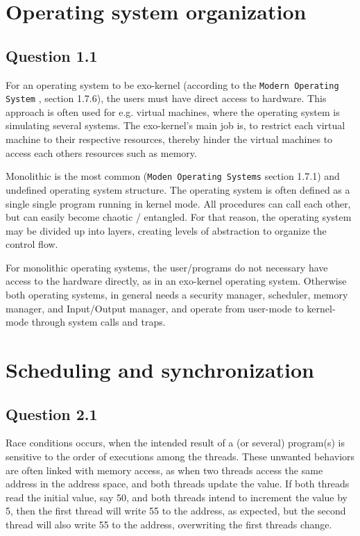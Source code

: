 
\section{Operating system organization}
\subsection*{Question 1.1}

For an operating system to be exo-kernel (according to the \texttt{Modern Operating System} \cite{tanembaum}, section 1.7.6), the users must have direct access to hardware. This approach is often used for e.g. virtual machines, where the operating system is simulating several systems. The exo-kernel's main job is, to restrict each virtual machine to their respective resources, thereby hinder the virtual machines to access each others resources such as memory. 

Monolithic is the most common (\texttt{Moden Operating Systems} section 1.7.1) and undefined operating system structure. The operating system is often defined as a single single program running in kernel mode. All procedures can call each other, but can easily become chaotic / entangled. For that reason, the operating system may be divided up into layers, creating levels of abstraction to organize the control flow.

For monolithic operating systems, the user/programs do not necessary have access to the hardware directly, as in an exo-kernel operating system. Otherwise both operating systems, in general needs a security manager, scheduler, memory manager, and Input/Output manager, and operate from user-mode to kernel-mode through system calls and traps.

\section{Scheduling and synchronization}
\subsection*{Question 2.1}

Race conditions occurs, when the intended result of a (or several) program(s) is sensitive to the order of executions among the threads. These unwanted behaviors are often linked with memory access, as when two threads access the same address in the address space, and both threads update the value. If both threads read the initial value, say 50, and both threads intend to increment the value by 5, then the first thread will write 55 to the address, as expected, but the second thread will also write 55 to the address, overwriting the first threads change. 


